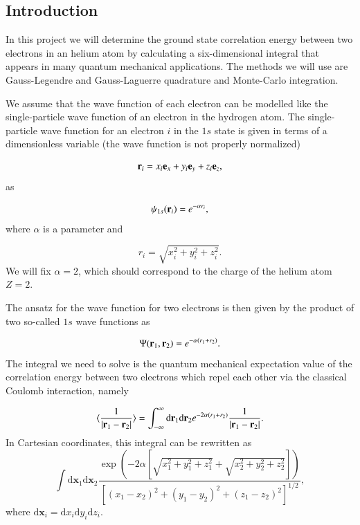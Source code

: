 \documentclass{article}
\begin{document}
\begin{multicols}{2}

\section{Introduction}
In this project we will determine the ground state correlation energy between two electrons in an helium atom by calculating a six-dimensional integral that appears in many quantum mechanical applications. The methods we will use are Gauss-Legendre and Gauss-Laguerre quadrature and Monte-Carlo integration. 

We assume that the wave function of each electron can be modelled like the single-particle wave function of an electron in the hydrogen atom. The single-particle wave function  for an electron $i$ in the $1s$ state  is given in terms of a dimensionless variable (the wave function is not properly normalized)

\begin{equation*}
	{\bf r}_i =  x_i {\bf e}_x + y_i {\bf e}_y +z_i {\bf e}_z ,
\end{equation*}
as

\begin{equation*}
	\psi_{1s}({\bf r}_i)  =   e^{-\alpha r_i},
\end{equation*}
where $\alpha$ is a parameter and 

\begin{equation*}
	r_i = \sqrt{x_i^2+y_i^2+z_i^2}.
\end{equation*}
We will fix $\alpha=2$, which should correspond to the charge of the helium atom $Z=2$. 

The ansatz for the wave function for two electrons is then given by the product of two 
so-called $1s$ wave functions as 

\begin{equation*}
	\Psi({\bf r}_1,{\bf r}_2)  =   e^{-\alpha (r_1+r_2)}.
\end{equation*}
The integral we need to solve is the quantum mechanical expectation value of the correlation energy between two electrons which repel each other via the classical Coulomb interaction, namely

\begin{equation}\label{eq:correlationenergy}
	\langle \frac{1}{|{\bf r}_1-{\bf r}_2|} \rangle = \int_{-\infty}^{\infty} \mathrm{d}{\bf r}_1\mathrm{d}{\bf r}_2  e^{-2\alpha (r_1+r_2)}\frac{1}{|{\bf r}_1-{\bf r}_2|}.
\end{equation}
In Cartesian coordinates, this integral can be rewritten as
\begin{equation}\label{eq:cartesian}
	\int\mathrm{d}\textbf{x}_1\mathrm{d}\textbf{x}_2\frac{\exp\left(-2\alpha\left[\sqrt{x_1^2+y_1^2+z_1^2}+ \sqrt{x_2^2+y_2^2+z_2^2}\right]\right)}{\left[(x_1-x_2)^2+(y_1-y_2)^2+(z_1-z_2)^2\right]^{1/2}},
\end{equation}
where $\mathrm{d}\textbf{x}_i=\mathrm{d}x_i\mathrm{d}y_i\mathrm{d}z_i$.



\end{multicols}
\end{document}

